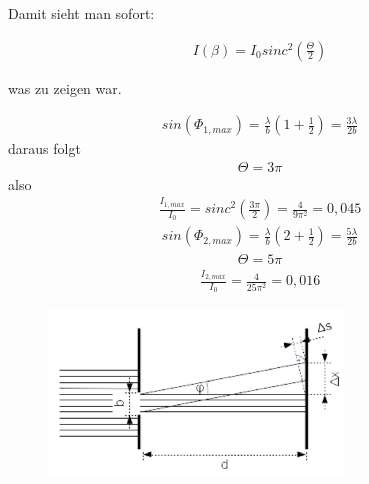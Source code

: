 \documentclass[a4paper,10pt]{scrartcl}
\begin{document}
Damit sieht man sofort: 

\begin{align*}
I(\beta)=I_{0}sinc^{2}(\frac{\Theta}{2})
\end{align*}

was zu zeigen war.

\begin{align*}
sin(\Phi_{1,max})=\frac{\lambda}{b}(1+\frac{1}{2})=\frac{3\lambda}{2b}
\end{align*}
daraus folgt 
\begin{align*}
\Theta=3\pi
\end{align*}
also
\begin{align*}
\frac{I_{1,max}}{I_{0}}=sinc^{2}(\frac{3\pi}{2})=\frac{4}{9\pi^{2}}=0,045
\end{align*}
\begin{align*}
sin(\Phi_{2,max})=\frac{\lambda}{b}(2+\frac{1}{2})=\frac{5\lambda}{2b}
\end{align*}
\begin{align*}
\Theta=5\pi
\end{align*}
\begin{align*}
\frac{I_{2,max}}{I_{0}}=\frac{4}{25\pi^{2}}=0,016
\end{align*}
\FloatBarrier
			\begin{figure}[h]
\centering
\includegraphics[width=0.7\textwidth]{./Bilder/lb4}

\end{figure}
\FloatBarrier
\end{document}
